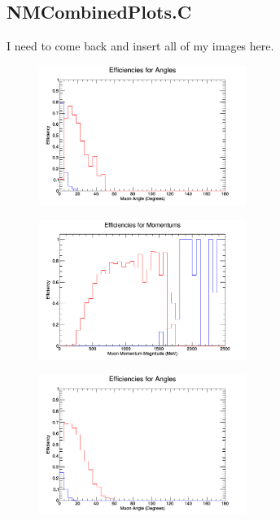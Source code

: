 \documentclass[11pt]{article}
\begin{document}
\subsection{NMCombinedPlots.C}
I need to come back and insert all of my images here.

\begin{figure}[H]
\centering
\includegraphics[width=0.6\textwidth]{NMCombinedPlotsImages/1-NMCombinedPlots.png}
\caption{}
\end{figure}

\begin{figure}[H]
\centering
\includegraphics[width=0.6\textwidth]{NMCombinedPlotsImages/2-NMCombinedPlots.png}
\caption{}
\end{figure}

\begin{figure}[H]
\centering
\includegraphics[width=0.6\textwidth]{NMCombinedPlotsImages/3-NMCombinedPlots.png}
\caption{}
\end{figure}
\end{document}
